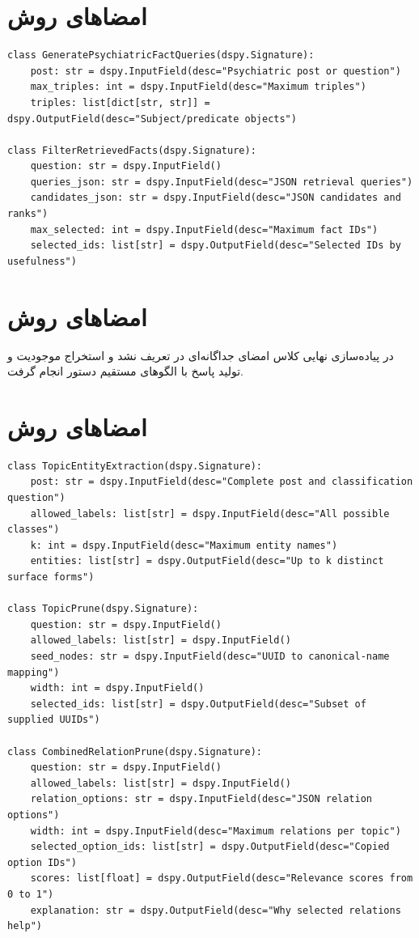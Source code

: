 \section{امضاهای روش }
\begin{latin}\footnotesize\begin{verbatim}
class GeneratePsychiatricFactQueries(dspy.Signature):
    post: str = dspy.InputField(desc="Psychiatric post or question")
    max_triples: int = dspy.InputField(desc="Maximum triples")
    triples: list[dict[str, str]] = dspy.OutputField(desc="Subject/predicate objects")

class FilterRetrievedFacts(dspy.Signature):
    question: str = dspy.InputField()
    queries_json: str = dspy.InputField(desc="JSON retrieval queries")
    candidates_json: str = dspy.InputField(desc="JSON candidates and ranks")
    max_selected: int = dspy.InputField(desc="Maximum fact IDs")
    selected_ids: list[str] = dspy.OutputField(desc="Selected IDs by usefulness")
\end{verbatim}
\end{latin}

\section{امضاهای روش }
در پیاده‌سازی نهایی  کلاس امضای جداگانه‌ای در  تعریف نشد و استخراج موجودیت و تولید پاسخ با الگوهای مستقیم دستور انجام گرفت.

\section{امضاهای روش }
\begin{latin}\footnotesize\begin{verbatim}
class TopicEntityExtraction(dspy.Signature):
    post: str = dspy.InputField(desc="Complete post and classification question")
    allowed_labels: list[str] = dspy.InputField(desc="All possible classes")
    k: int = dspy.InputField(desc="Maximum entity names")
    entities: list[str] = dspy.OutputField(desc="Up to k distinct surface forms")

class TopicPrune(dspy.Signature):
    question: str = dspy.InputField()
    allowed_labels: list[str] = dspy.InputField()
    seed_nodes: str = dspy.InputField(desc="UUID to canonical-name mapping")
    width: int = dspy.InputField()
    selected_ids: list[str] = dspy.OutputField(desc="Subset of supplied UUIDs")

class CombinedRelationPrune(dspy.Signature):
    question: str = dspy.InputField()
    allowed_labels: list[str] = dspy.InputField()
    relation_options: str = dspy.InputField(desc="JSON relation options")
    width: int = dspy.InputField(desc="Maximum relations per topic")
    selected_option_ids: list[str] = dspy.OutputField(desc="Copied option IDs")
    scores: list[float] = dspy.OutputField(desc="Relevance scores from 0 to 1")
    explanation: str = dspy.OutputField(desc="Why selected relations help")
\end{verbatim}
\end{latin}


